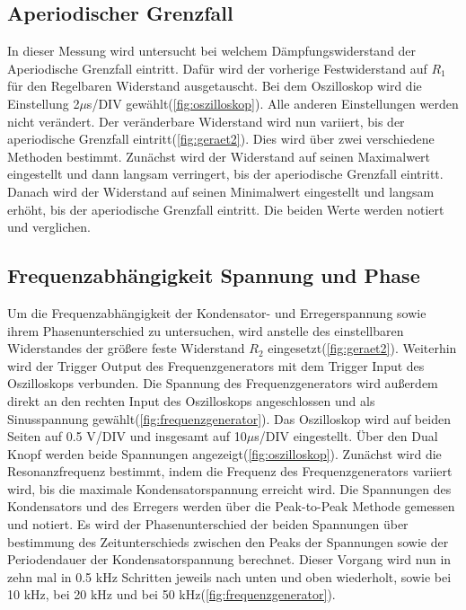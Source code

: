 \subsection{Aperiodischer Grenzfall}
In dieser Messung wird untersucht bei welchem Dämpfungswiderstand der Aperiodische Grenzfall eintritt. Dafür wird der vorherige Festwiderstand auf $R_1$ für den Regelbaren Widerstand ausgetauscht. Bei dem Oszilloskop wird die Einstellung 2$\mu$s/DIV gewählt(\ref{fig:oszilloskop}). Alle anderen Einstellungen werden nicht verändert. Der veränderbare Widerstand wird nun variiert, bis der aperiodische Grenzfall eintritt(\ref{fig:geraet2}).
Dies wird über zwei verschiedene Methoden bestimmt. Zunächst wird der Widerstand auf seinen Maximalwert eingestellt und dann langsam verringert, bis der aperiodische Grenzfall eintritt. Danach wird der Widerstand auf seinen Minimalwert eingestellt und langsam erhöht, bis der aperiodische Grenzfall eintritt. Die beiden Werte werden notiert und verglichen.
\subsection{Frequenzabhängigkeit Spannung und Phase}
Um die Frequenzabhängigkeit der Kondensator- und Erregerspannung sowie ihrem Phasenunterschied zu untersuchen, wird anstelle des einstellbaren Widerstandes der größere feste Widerstand $R_2$ eingesetzt(\ref{fig:geraet2}). Weiterhin wird der Trigger Output des Frequenzgenerators mit dem Trigger Input des Oszilloskops verbunden. Die Spannung des Frequenzgenerators wird außerdem direkt an den rechten Input des Oszilloskops angeschlossen und als Sinusspannung gewählt(\ref{fig:frequenzgenerator}).
Das Oszilloskop wird auf beiden Seiten auf 0.5 V/DIV und insgesamt auf 10$\mu$s/DIV eingestellt. Über den Dual Knopf werden beide Spannungen angezeigt(\ref{fig:oszilloskop}). 
Zunächst wird die Resonanzfrequenz bestimmt, indem die Frequenz des Frequenzgenerators variiert wird, bis die maximale Kondensatorspannung erreicht wird. Die Spannungen des Kondensators und des Erregers werden über die Peak-to-Peak Methode gemessen und notiert. Es wird der Phasenunterschied der beiden Spannungen über bestimmung des Zeitunterschieds zwischen den Peaks der Spannungen sowie der Periodendauer der Kondensatorspannung berechnet. Dieser Vorgang wird nun in zehn mal in 0.5 kHz Schritten jeweils nach unten und oben wiederholt, sowie bei 10 kHz, bei 20 kHz und bei 50 kHz(\ref{fig:frequenzgenerator}).